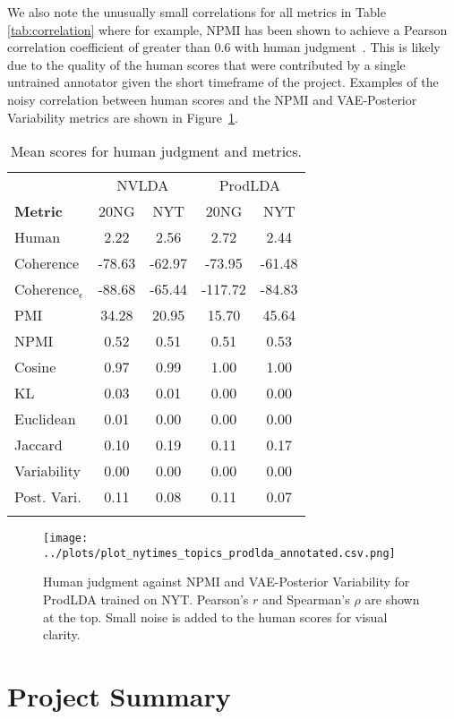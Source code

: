 \documentclass[10pt]{article}
\begin{document}
We also note the unusually small correlations for all metrics in Table \ref{tab:correlation} where for example, NPMI has been shown to achieve a Pearson correlation coefficient of greater than 0.6 with human judgment~\cite{Xing:2019}. This is likely due to the quality of the human scores that were contributed by a single untrained annotator given the short timeframe of the project. Examples of the noisy correlation between human scores and the NPMI and VAE-Posterior Variability metrics are shown in Figure~\ref{fig:correlation}.

\begin{table}[t]
\centering
\begin{tabular}{l|cccc}
\Xhline{4\arrayrulewidth}
& \multicolumn{2}{c}{NVLDA} & \multicolumn{2}{c}{ProdLDA} \\
\textbf{Metric} & 20NG & NYT & 20NG & NYT \\
\hline
Human & 2.22 & 2.56 & 2.72 & 2.44 \\
\hline
Coherence & -78.63 & -62.97 & -73.95 & -61.48 \\
Coherence$_\epsilon$ & -88.68 & -65.44 & -117.72 & -84.83 \\
PMI & 34.28 & 20.95 & 15.70 & 45.64 \\
NPMI & 0.52 & 0.51 & 0.51 & 0.53 \\
\hline
Cosine & 0.97 & 0.99 & 1.00 & 1.00 \\
KL & 0.03 & 0.01 & 0.00 & 0.00 \\
Euclidean & 0.01 & 0.00 & 0.00 & 0.00 \\
Jaccard & 0.10 & 0.19 & 0.11 & 0.17 \\
Variability & 0.00 & 0.00 & 0.00 & 0.00 \\
Post. Vari. & 0.11 & 0.08 & 0.11 & 0.07 \\
\Xhline{3\arrayrulewidth}
\end{tabular}
\caption{Mean scores for human judgment and metrics.}
\label{tab:scores}
\end{table}

\begin{figure}[t]
\centering
\texttt{[image: ../plots/plot\_nytimes\_topics\_prodlda\_annotated.csv.png]}
\caption{Human judgment against NPMI and VAE-Posterior Variability for ProdLDA trained on NYT. Pearson's $r$ and Spearman's $\rho$ are shown at the top. Small noise is added to the human scores for visual clarity.}
\label{fig:correlation}
\end{figure}

\section{Project Summary}
\end{document}
